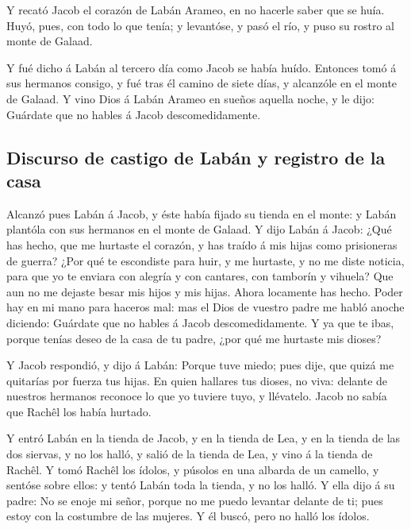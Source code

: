  Y recató Jacob el corazón de Labán Arameo, en no hacerle
saber que se huía.  Huyó, pues, con todo lo que tenía; y
levantóse, y pasó el río, y puso su rostro al monte de Galaad.

 Y fué dicho á Labán al tercero día como Jacob se había
huído.  Entonces tomó á sus hermanos consigo, y fué tras él
camino de siete días, y alcanzóle en el monte de Galaad.  Y
vino Dios á Labán Arameo en sueños aquella noche, y le dijo: Guárdate
que no hables á Jacob descomedidamente.

\hypertarget{discurso-de-castigo-de-labuxe1n-y-registro-de-la-casa}{%
\subsection{Discurso de castigo de Labán y registro de la
casa}\label{discurso-de-castigo-de-labuxe1n-y-registro-de-la-casa}}

 Alcanzó pues Labán á Jacob, y éste había fijado su tienda
en el monte: y Labán plantóla con sus hermanos en el monte de Galaad.
 Y dijo Labán á Jacob: ¿Qué has hecho, que me hurtaste el
corazón, y has traído á mis hijas como prisioneras de guerra?
 ¿Por qué te escondiste para huir, y me hurtaste, y no me
diste noticia, para que yo te enviara con alegría y con cantares, con
tamborín y vihuela?  Que aun no me dejaste besar mis hijos
y mis hijas. Ahora locamente has hecho.  Poder hay en mi
mano para haceros mal: mas el Dios de vuestro padre me habló anoche
diciendo: Guárdate que no hables á Jacob descomedidamente. 
Y ya que te ibas, porque tenías deseo de la casa de tu padre, ¿por qué
me hurtaste mis dioses?

 Y Jacob respondió, y dijo á Labán: Porque tuve miedo; pues
dije, que quizá me quitarías por fuerza tus hijas.  En
quien hallares tus dioses, no viva: delante de nuestros hermanos
reconoce lo que yo tuviere tuyo, y llévatelo. Jacob no sabía que Rachêl
los había hurtado.

 Y entró Labán en la tienda de Jacob, y en la tienda de
Lea, y en la tienda de las dos siervas, y no los halló, y salió de la
tienda de Lea, y vino á la tienda de Rachêl.  Y tomó Rachêl
los ídolos, y púsolos en una albarda de un camello, y sentóse sobre
ellos: y tentó Labán toda la tienda, y no los halló.  Y
ella dijo á su padre: No se enoje mi señor, porque no me puedo levantar
delante de ti; pues estoy con la costumbre de las mujeres. Y él buscó,
pero no halló los ídolos.

